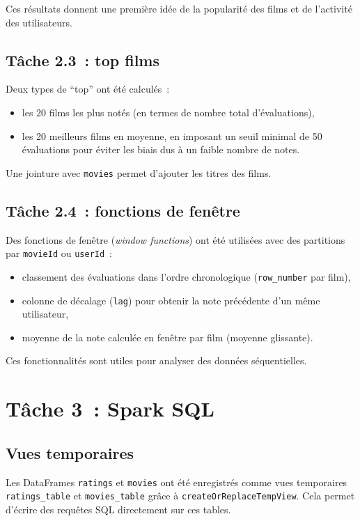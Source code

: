 \documentclass[a4paper,11pt]{article}
\begin{document}
Ces résultats donnent une première idée de la popularité des films
et de l'activité des utilisateurs.

\subsection{Tâche 2.3~: top films}

Deux types de ``top'' ont été calculés~:
\begin{itemize}
  \item les 20 films les plus notés (en termes de nombre total
        d'évaluations),
  \item les 20 meilleurs films en moyenne, en imposant un seuil
        minimal de 50 évaluations pour éviter les biais dus à un
        faible nombre de notes.
\end{itemize}

Une jointure avec \texttt{movies} permet d'ajouter les titres des films.

\subsection{Tâche 2.4~: fonctions de fenêtre}

Des fonctions de fenêtre (\emph{window functions}) ont été utilisées
avec des partitions par \texttt{movieId} ou \texttt{userId}~:
\begin{itemize}
  \item classement des évaluations dans l'ordre chronologique
        (\texttt{row\_number} par film),
  \item colonne de décalage (\texttt{lag}) pour obtenir la note
        précédente d'un même utilisateur,
  \item moyenne de la note calculée en fenêtre par film
        (moyenne glissante).
\end{itemize}

Ces fonctionnalités sont utiles pour analyser des données séquentielles.

\section{Tâche 3~: Spark SQL}

\subsection{Vues temporaires}

Les DataFrames \texttt{ratings} et \texttt{movies} ont été
enregistrés comme vues temporaires \texttt{ratings\_table}
et \texttt{movies\_table} grâce à
\texttt{createOrReplaceTempView}. Cela permet d'écrire des
requêtes SQL directement sur ces tables.
\end{document}
